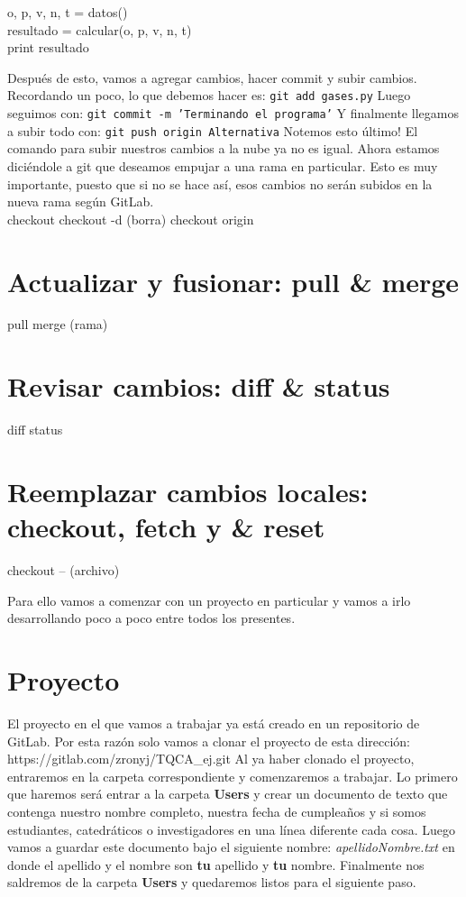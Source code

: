 \documentclass[10pt,letterpaper]{article}
\newcommand{\inlinecode}[1]{
\colorbox{light-gray}{\texttt{#1}}
}
\newenvironment{Code}
{
\begin{lrbox}{\selvestebox}%
\begin{minipage}{\dimexpr\columnwidth-2\fboxsep\relax}
\fontfamily{\ttdefault}\selectfont
}
{\end{minipage}\end{lrbox}%
\begin{center}
\colorbox{light-gray}{\usebox{\selvestebox}}
\end{center}
}
\begin{document}
\begin{Code}
o, p, v, n, t = datos()\\
resultado = calcular(o, p, v, n, t)\\
print resultado
\end{Code}

Despu\'es de esto, vamos a agregar cambios, hacer commit y subir cambios. Recordando un poco, lo que debemos hacer es: \inlinecode{git add gases.py} Luego seguimos con: \inlinecode{git commit -m 'Terminando el programa'} Y finalmente llegamos a subir todo con: \inlinecode{git push origin Alternativa} Notemos esto \'ultimo! El comando para subir nuestros cambios a la nube ya no es igual. Ahora estamos dici\'endole a git que deseamos empujar a una rama en particular. Esto es muy importante, puesto que si no se hace as\'i, esos cambios no ser\'an subidos en la nueva rama seg\'un GitLab.\\

checkout
checkout -d (borra)
checkout origin

\section{Actualizar y fusionar: pull \& merge}
pull
merge (rama)

\section{Revisar cambios: diff \& status}
diff
status

\section{Reemplazar cambios locales: checkout, fetch y \& reset}
checkout -- (archivo)

Para ello vamos a comenzar con un proyecto en particular y vamos a irlo desarrollando poco a poco entre todos los presentes.

\section{Proyecto}
El proyecto en el que vamos a trabajar ya est\'a creado en un repositorio de GitLab. Por esta raz\'on solo vamos a clonar el proyecto de esta direcci\'on: https://gitlab.com/zronyj/TQCA\_ej.git Al ya haber clonado el proyecto, entraremos en la carpeta correspondiente y comenzaremos a trabajar. Lo primero que haremos ser\'a entrar a la carpeta \textbf{Users} y crear un documento de texto que contenga nuestro nombre completo, nuestra fecha de cumplea\~nos y si somos estudiantes, catedr\'aticos o investigadores en una l\'inea diferente cada cosa. Luego vamos a guardar este documento bajo el siguiente nombre: \emph{apellidoNombre.txt} en donde el apellido y el nombre son \textbf{tu} apellido y \textbf{tu} nombre. Finalmente nos saldremos de la carpeta \textbf{Users} y quedaremos listos para el siguiente paso.\\
\end{document}
